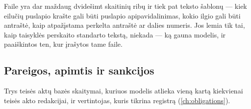 Faile  yra dar maždaug dvidešimt skaitinių ribų ir tiek pat teksto
šablonų --- kiek eilučių puslapio krašte gali būti puslapio apipavidalinimas, kokio ilgio gali
būti antraštė, kaip atpažįstama perkelta antraštė ar dalies numeris. Jos lemia tik tai, kaip
taisyklės perskaito standarto tekstą, niekada --- ką gauna modelis, ir paaiškintos ten, kur
įrašytos tame faile.


\subsection{Pareigos, apimtis ir sankcijos}\label{sec:config:obligations}

Trys teisės aktų bazės skaitymai, kuriuos modelis atlieka vieną kartą kiekvienai teisės akto
redakcijai, ir vertintojas, kuris tikrina registrą (\cref{ch:obligations}).

